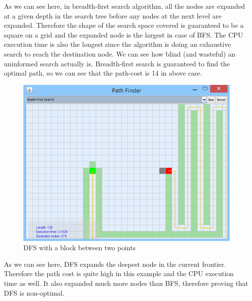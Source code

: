 \documentclass[a4paper]{article}
\begin{document}
\noindent As we can see here, in breadth-first search algorithm, all the nodes are expanded at a given depth in the search tree before any nodes at the next level are expanded. Therefore the shape of the search space covered is guaranteed to be a square on a grid and the expanded node is the largest in case of BFS. The CPU execution time is also the longest since the algorithm is doing an exhaustive search to reach the destination node. We can see how blind (and wasteful) an uninformed search actually is. Breadth-first search is guaranteed to find the optimal path, so we can see that the path-cost is 14 in above case. \\

\begin{figure}[h!]
  \centering
    \includegraphics[scale=.9]{images/dfs1.png}
  \caption{DFS with a block between two points}
\end{figure}

\noindent As we can see here, DFS expands the deepest node in the current frontier. Therefore the path cost is quite high in this example and the CPU execution time as well. It also expanded much more nodes than BFS, therefore proving that DFS is non-optimal. \\
\end{document}
